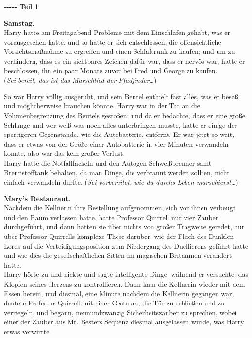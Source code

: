 

\hypertarget{teil-1}{%

\textbf{\uline{-\/-\/-\/-\/- Teil 1}}

\textbf{Samstag}.\\ Harry hatte am Freitagabend Probleme mit dem Einschlafen gehabt, was er vorausgesehen hatte, und so hatte er sich entschlossen, die offensichtliche Vorsichtsmaßnahme zu ergreifen und einen Schlaftrunk zu kaufen; und um zu verhindern, dass es ein sichtbares Zeichen dafür war, dass er nervös war, hatte er beschlossen, ihn ein paar Monate zuvor bei Fred und George zu kaufen.\\ (\emph{Sei bereit, das ist das Marschlied der Pfadfinder…})

So war Harry völlig ausgeruht, und sein Beutel enthielt fast alles, was er besaß und möglicherweise brauchen könnte. Harry war in der Tat an die Volumenbegrenzung des Beutels gestoßen; und da er bedachte, dass er eine große Schlange und wer-weiß-was-noch alles unterbringen musste, hatte er einige der sperrigeren Gegenstände, wie die Autobatterie, entfernt. Er war jetzt so weit, dass er etwas von der Größe einer Autobatterie in vier Minuten verwandeln konnte, also war das kein großer Verlust.\\ Harry hatte die Notfallfackeln und den Autogen-Schweißbrenner samt Brennstofftank behalten, da man Dinge, die verbrannt werden sollten, nicht einfach verwandeln durfte. (\emph{Sei vorbereitet, wie du durchs Leben marschierst…})

\textbf{Mary's Restaurant.}\\ Nachdem die Kellnerin ihre Bestellung aufgenommen, sich vor ihnen verbeugt und den Raum verlassen hatte, hatte Professor Quirrell nur vier Zauber durchgeführt, und dann hatten sie über nichts von großer Tragweite geredet, nur über Professor Quirrells komplexe These darüber, wie der Fluch des Dunklen Lords auf die Verteidigungsposition zum Niedergang des Duellierens geführt hatte und wie dies die gesellschaftlichen Sitten im magischen Britannien verändert hatte.\\ Harry hörte zu und nickte und sagte intelligente Dinge, während er versuchte, das Klopfen seines Herzens zu kontrollieren. Dann kam die Kellnerin wieder mit dem Essen herein, und diesmal, eine Minute nachdem die Kellnerin gegangen war, deutete Professor Quirrell mit einer Geste an, die Tür zu schließen und zu verriegeln, und begann, neunundzwanzig Sicherheitszauber zu sprechen, wobei einer der Zauber aus Mr. Besters Sequenz diesmal ausgelassen wurde, was Harry etwas verwirrte.

}
